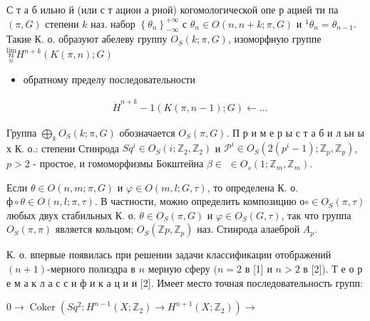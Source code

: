 \documentclass[10pt]{article}
\begin{document}
С т а б ильно й (или с т ацион а рной) когомологической опе р ацией ти па $(\pi, G)$ степени $k$ наз. набор $\left\{\theta_{n}\right\}_{-\infty}^{+\infty}$ с $\theta_{n} \in O(n, n+k ; \pi, G)$ и ${ }^{1} \theta_{n}=\theta_{n-1}$. Такие К. о. образуют абелеву группу $O_{S}(k ; \pi, G)$, изоморфную группе $\underset{n}{\stackrel{\lim }{n}} H^{n+k}(K(\pi, n) ; G)$



\begin{itemize}

  \item обратному пределу последовательности

\end{itemize}



\[

\begin{aligned}

& \ddot{H}^{n+k}-1(K(\pi, n-1) ; G) \longleftarrow \ldots

\end{aligned}

\]



Группа $\bigoplus_{k} O_{S}(k ; \pi, G)$ обозначается $O_{S}(\pi, G)$. П р и м е р ы с т а б и л ьн ы х К. о.: степени Стинрода $S q^{i} \in O_{S}\left(i ; \mathbb{Z}_{2}, \mathbb{Z}_{2}\right)$ и $\mathscr{P}^{i} \in O_{S}\left(2\left(p^{i}-1\right) ; \mathbb{Z}_{p}, \mathbb{Z}_{p}\right)$, $p>2$ - простое, и гомоморфизмы Бокштейна $\beta \in$ $\in O_{s}\left(1 ; \mathbb{Z}_{m}, \mathbb{Z}_{m}\right)$.



Если $\theta \in O(n, m ; \pi, G)$ и $\varphi \in O(m, l ; G, \tau)$, то определена К. о. $ф \circ \theta \in O(n, l ; \pi, \tau)$. В частности, можно определить композицию $о \circ \in O_{S}(\pi, \tau)$ любых двух стабильных К. о. $\theta \in O_{S}(\pi, G)$ и $\varphi \in O_{S}(G, \tau)$, так что группа $O_{S}(\pi, \pi)$ является кольцом; $O_{S}\left(\mathbb{Z} p, \mathbb{Z}_{p}\right)$ наз. Стинрода алаеброй $A_{p}$.



К. о. впервые появилась при решении задачи классификации отображений $(n+1)$-мерного полиэдра в $n$ мерную сферу $(n=2$ в [1] и $n>2$ в [2]). Т е о р е м а к л а с с и ф и к а ц и и [2]. Имеет место точная последовательность групп:



$0 \longrightarrow \operatorname{Coker}\left(S q^{2}: H^{n-1}\left(X ; \mathbb{Z}_{2}\right) \longrightarrow H^{n+1}\left(X ; \mathbb{Z}_{2}\right)\right) \longrightarrow$
\end{document}
